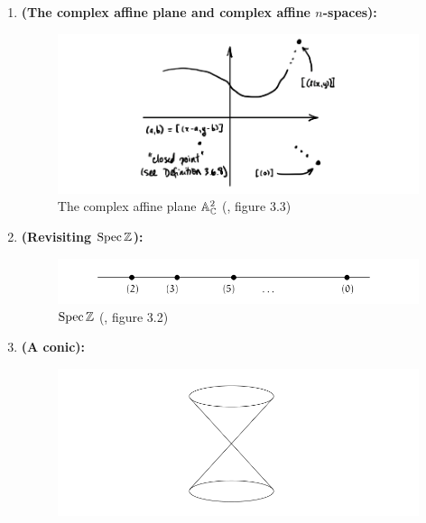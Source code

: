             \begin{example}
                \noindent
                \begin{enumerate}
                    \item \textbf{(The complex affine plane and complex affine $n$-spaces):}
                        \begin{figure}[H]
                            \centering
                            \includegraphics[width=\linewidth,height=\textheight,keepaspectratio]{Figures/complex affine plane.png}
                            \caption{The complex affine plane $\mathbb{A}^2_{\mathbb{C}}$ (\cite{risingsea}, figure 3.3)}
                            \label{fig: complex_affine_plane}
                        \end{figure}
                    \item \textbf{(Revisiting $\operatorname{Spec} \mathbb{Z}$):}
                        \begin{figure}[H]
                            \centering
                            \includegraphics[width=\linewidth,height=\textheight,keepaspectratio]{Figures/Spec Z.png}
                            \caption{$\operatorname{Spec} \mathbb{Z}$ (\cite{risingsea}, figure 3.2)}
                            \label{fig: Spec_Z}
                        \end{figure}
                    \item \textbf{(A conic):}
                        \begin{figure}[H]
                            \centering
                            \includegraphics[width=\linewidth,height=\textheight,keepaspectratio]{Figures/conic.png}

\end{figure}
\end{enumerate}
\end{example}
